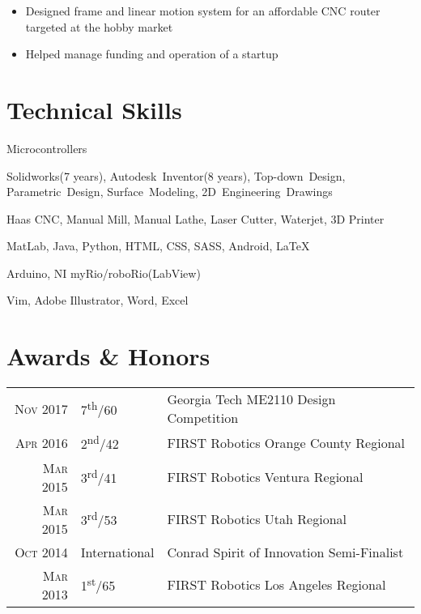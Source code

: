 \documentclass{resume}
\begin{document}
\begin{itemize}
  \item Designed frame and linear motion system for an affordable CNC router targeted at the hobby market
  \item Helped manage funding and operation of a startup
\end{itemize}

\section{Technical Skills}
\begin{skills}{Microcontrollers}
  \item [CAD] Solidworks(7 years), Autodesk~Inventor(8 years), Top-down~Design, Parametric~Design, Surface~Modeling, 2D~Engineering~Drawings
  \item [Manufacturing] Haas CNC, Manual Mill, Manual Lathe, Laser Cutter, Waterjet, 3D Printer
  \item [Programming] MatLab, Java, Python, HTML, CSS, SASS, Android, \LaTeX
  \item [Microcontrollers] Arduino, NI myRio/roboRio(LabView)
  \item [Software] Vim, Adobe Illustrator, Word, Excel
\end{skills}

\section{Awards \& Honors}
\begin{tabular}{rll}
  \textsc{Nov} 2017 & 7\textsuperscript{th}/60 & Georgia Tech ME2110 Design Competition\\
  \textsc{Apr} 2016 & 2\textsuperscript{nd}/42 & FIRST Robotics Orange County Regional\\
  \textsc{Mar} 2015 & 3\textsuperscript{rd}/41 & FIRST Robotics Ventura Regional\\
  \textsc{Mar} 2015 & 3\textsuperscript{rd}/53 & FIRST Robotics Utah Regional\\
  \textsc{Oct} 2014 & International & Conrad Spirit of Innovation Semi-Finalist\\
  \textsc{Mar} 2013 & 1\textsuperscript{st}/65 & FIRST Robotics Los Angeles Regional\\
\end{tabular}
\end{document}

